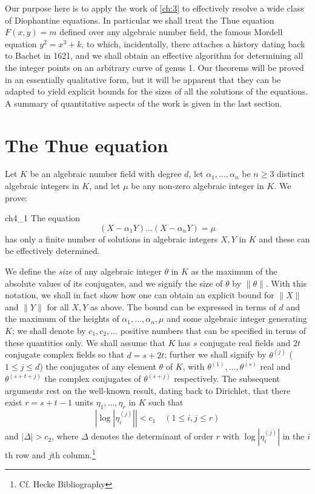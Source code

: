 Our purpose here is to apply the work of \autoref{ch:3} to effectively resolve a wide class of Diophantine equations. In particular we shall treat the Thue equation $F(x,y)=m$ defined over any algebraic number field, the famous Mordell equation $y^2=x^3+k$, to which, incidentally, there attaches a history dating back to Bachet in 1621, and we shall obtain an effective algorithm for determining all the integer points on an arbitrary curve of genus 1. Our theorems will be proved in an essentially qualitative form, but it will be apparent that they can be adapted to yield explicit bounds for the sizes of all the solutions of the equations. A summary of quantitative aspects of the work is given in the last section.

\section{The Thue equation}\label{sec:ch4_2}

Let $K$ be an algebraic number field with degree $d$, let $\alpha_1, \dots, \alpha_n$ be $n \ge 3$ distinct algebraic integers in $K$, and let $\mu$ be any non-zero algebraic integer in $K$. We prove:

\begin{mythm}{}{ch4_1}
The equation
\[
(X - \alpha_1 Y) \dots (X - \alpha_n Y) = \mu
\]
has only a finite number of solutions in algebraic integers $X, Y$ in $K$ and these can be effectively determined.
\end{mythm}

We define the \textit{size} of any algebraic integer $\theta$ in $K$ as the maximum of the absolute values of its conjugates, and we signify the size of $\theta$ by $\|\theta\|$. With this notation, we shall in fact show how one can obtain an explicit bound for $\|X\|$ and $\|Y\|$ for all $X, Y$ as above. The bound can be expressed in terms of $d$ and the maximum of the heights of $\alpha_1, \dots, \alpha_n, \mu$ and some algebraic integer generating $K$; we shall denote by $c_1, c_2, \dots$ positive numbers that can be specified in terms of these quantities only. We shall assume that $K$ has $s$ conjugate real fields and $2t$ conjugate complex fields so that $d = s + 2t$; further we shall signify by $\theta^{(j)}$ ($1 \le j \le d$) the conjugates of any element $\theta$ of $K$, with $\theta^{(1)}, \dots, \theta^{(s)}$ real and $\theta^{(s+t+j)}$ the complex conjugates of $\theta^{(s+j)}$ respectively. The subsequent arguments rest on the well-known result, dating back to Dirichlet, that there exist $r = s + t - 1$ units $\eta_1, \dots, \eta_r$ in $K$ such that
\[
\left|\log\left|\eta_i^{(j)}\right|\right| < c_1 \quad (1 \le i, j \le r)
\]
and $|\Delta| > c_2$, where $\Delta$ denotes the determinant of order $r$ with $\log|\eta_i^{(j)}|$ in the $i$th row and $j$th column.\footnote{Cf. Hecke Bibliography}

